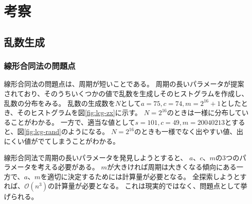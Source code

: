 \documentclass[../../../main]{subfiles}
\begin{document}
\section{考察}\label{sec:consideration}

\subsection{乱数生成}

\subsubsection{線形合同法の問題点}
線形合同法の問題点は、周期が短いことである。
周期の長いパラメータが提案されており、そのうちいくつかの値で乱数を生成しそのヒストグラムを作成し、
乱数の分布をみる。
乱数の生成数を$N$として$a=75, c=74, m=2^{16}+1$としたとき、そのヒストグラムを図\ref{fig:lcg-zx}に示す。
$N=2^{16}$のときは一様に分布していることがわかる。
一方で、適当な値として$s=101, c=49, m=20040213$とすると、図\ref{fig:lcg-rand}のようになる。
$N=2^{16}$のときも一様でなく出やすい値、出にくい値がでてしまうことがわかる。

線形合同法で周期の長いパラメータを発見しようとすると、
$a$、$c$、$m$の3つのパラメータを考える必要がある。
$m$が大きければ周期は大きくなる傾向にある一方で、$a$、$m$を適切に決定するためには計算量が必要となる。
全探索しようとすれば、$\mathcal{O}(n^3)$の計算量が必要となる。
これは現実的ではなく、問題点として挙げられる。



\clearpage
\end{document}
